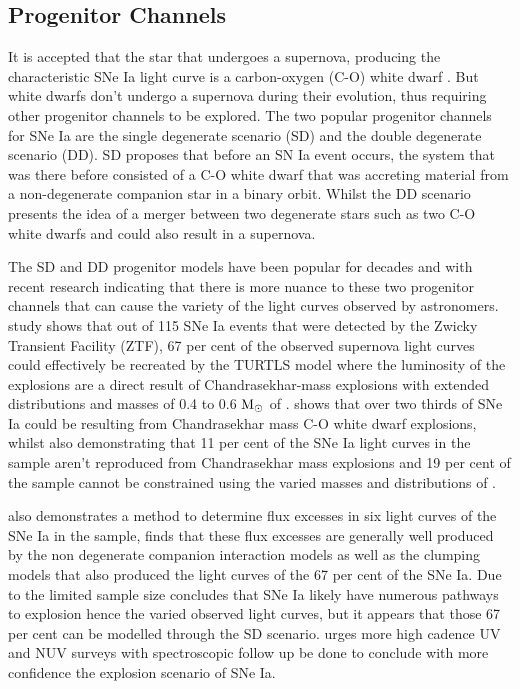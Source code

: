 \subsection{Progenitor Channels} \label{subsec: Progenitor Channels}
It is accepted that the star that undergoes a supernova, producing the characteristic SNe Ia light curve is a carbon-oxygen (C-O) white dwarf \parencite{hoyle_nucleosynthesis_1960}. But white dwarfs don't undergo a supernova during their evolution, thus requiring other progenitor channels to be explored\parencite{antonini_evolution_2026}. The two popular progenitor channels for SNe Ia are the single degenerate scenario (SD) and the double degenerate scenario (DD). SD proposes that before an SN Ia event occurs, the system that was there before consisted of a C-O white dwarf that was accreting material from a non-degenerate companion star in a binary orbit\parencite{whelan_binaries_1973}. Whilst the DD scenario presents the idea of a merger between two degenerate stars such as two C-O white dwarfs and could also result in a supernova\parencite{iben_supernovae_1984}. 

The SD and DD progenitor models have been popular for decades and with recent research indicating that there is more nuance to these two progenitor channels that can cause the variety of the light curves observed by astronomers. \textcite{deckers_constraining_2022} study shows that out of 115 SNe Ia events that were detected by the Zwicky Transient Facility (ZTF), 67 per cent of the observed supernova light curves could effectively be recreated by the TURTLS model where the luminosity of the explosions are a direct result of Chandrasekhar-mass explosions with extended distributions and masses of 0.4 to 0.6 \(\textup{M}_\odot\) of . \textcite{deckers_constraining_2022} shows that over two thirds of SNe Ia could be resulting from Chandrasekhar mass C-O white dwarf explosions, whilst also demonstrating that 11 per cent of the SNe Ia light curves in the sample aren't reproduced from Chandrasekhar mass explosions and 19 per cent of the sample cannot be constrained using the varied masses and distributions of .   

\textcite{deckers_constraining_2022} also demonstrates a method to determine flux excesses in six light curves of the SNe Ia in the sample, \textcite{deckers_constraining_2022} finds that these flux excesses are generally well produced by the non degenerate companion interaction models as well as the  clumping models that also produced the light curves of the 67 per cent of the SNe Ia. Due to the limited sample size \textcite{deckers_constraining_2022} concludes that SNe Ia likely have numerous pathways to explosion hence the varied observed light curves, but it appears that those 67 per cent can be modelled through the SD scenario. \textcite{deckers_constraining_2022} urges more high cadence UV and NUV surveys with spectroscopic follow up be done to conclude with more confidence the explosion scenario of SNe Ia. 

